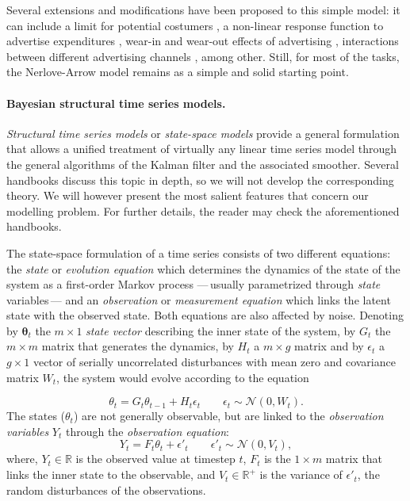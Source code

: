 Several extensions and modifications have been proposed to this simple model: it can include a limit for potential costumers \cite{vidale1957operations}, a non-linear response function to advertise expenditures \cite{little1975brandaid}, wear-in and wear-out effects of advertising \cite{naik1998planning},  interactions between different advertising channels \cite{bass2007wearout}, among other. Still, for most of the tasks, the  Nerlove-Arrow model remains as a simple and solid starting point. 

\paragraph{Bayesian structural time series models.}


\emph{Structural time series models} or \emph{state-space models} provide a general formulation that  allows a unified treatment of virtually any linear time series model through the general algorithms of the Kalman filter and the associated smoother. Several handbooks \cite{durbin2012time, petris2009dynamic, sarkka2013bayesian, west1998bayesian} discuss this topic in depth, so  we will not develop the corresponding theory. We will however present the most salient features that concern our modelling problem. For further details, the reader may check the aforementioned handbooks. 

The state-space formulation of a time series consists of two different equations: the \emph{state} or \emph{evolution equation} which determines the dynamics of the state of the system as a first-order Markov process ---\,usually parametrized through \emph{state} variables\,--- and an \emph{observation} or \emph{measurement  equation} which links the latent state with the observed state. Both equations are also affected by noise. Denoting by $\mathbf{\theta}_t$ the $m\times1$ \emph{state vector} describing the inner state of the system, by $G_t$ the $m\times m$ matrix that generates the dynamics, by $H_t$ a $m\times g$ matrix and by $ \epsilon_t $ a $g\times 1$ vector of serially uncorrelated disturbances with mean zero and covariance matrix $W_t$, the system would evolve according to the equation

\begin{equation}\label{eq:st}
\theta_{t} = G_t \theta_{t-1} + H_t \epsilon_t \qquad \epsilon_t \sim \mathcal{N}(0, W_t).
\end{equation}
The states ($\theta_t$) are not generally observable, but are linked to the \emph{observation variables} $Y_t$ through the \emph{observation equation}:
\begin{equation}\label{eq:obs}
Y_t = F_t \theta_t + \epsilon'_t \qquad \epsilon'_t \sim \mathcal{N}(0, V_t),
\end{equation}
where, $Y_t \in \mathbb{R}$ is the observed value at timestep $t$, $F_t$ is the $1\times m$ matrix that links the inner state to the observable, and $V_t \in \mathbb{R}^+$ is the variance of $\epsilon'_t $, the random disturbances of the observations.

